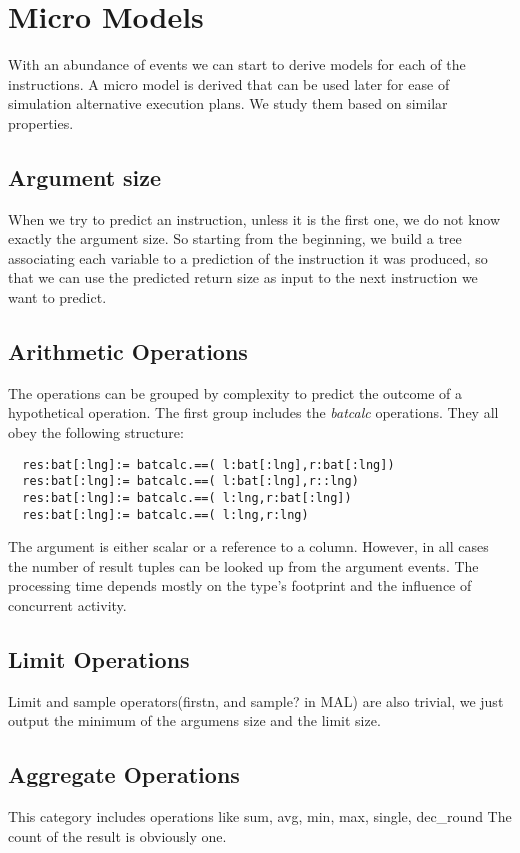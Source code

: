 \section{Micro Models}
With an abundance of events we can start to derive models for each of the instructions.
A micro model is derived that can be used later for ease of simulation
alternative execution plans. We study them based on similar properties.

\subsection{Argument size}
When we try to predict an instruction, unless it is the first one,
we do not know exactly the argument size. So starting from the beginning,
we build a tree associating each variable to a prediction of the instruction it was produced,
so that we can use the predicted return size as input to the next instruction
we want to predict.

\subsection{Arithmetic Operations}
The operations can be grouped by complexity to predict the outcome of a hypothetical operation.
The first group includes the {\em batcalc} operations.
They all obey the following structure:
\begin{verbatim}
  res:bat[:lng]:= batcalc.==( l:bat[:lng],r:bat[:lng])
  res:bat[:lng]:= batcalc.==( l:bat[:lng],r::lng)
  res:bat[:lng]:= batcalc.==( l:lng,r:bat[:lng])
  res:bat[:lng]:= batcalc.==( l:lng,r:lng)

\end{verbatim}
The argument is either scalar or a reference to a column.
However, in all cases the number of result tuples can be looked up from the argument events.
The processing time depends mostly on the type's footprint and the influence of concurrent activity.


\subsection{Limit Operations}
Limit and sample operators(firstn, and sample? in MAL) are also trivial,
we just output the minimum of the argumens size and the limit size.


\subsection{Aggregate Operations}
This category includes operations like sum, avg, min, max, single, dec\_round
The count of the result is obviously one.

